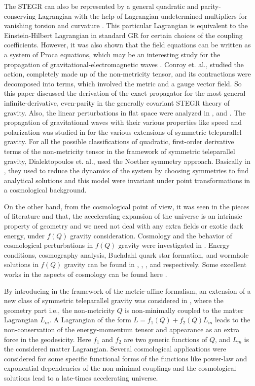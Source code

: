 \documentclass[showpacs,aps,amssymb,preprintnumbers,prd,amsmath,floatfix]{revtex4}
\begin{document}
The STEGR can also be represented by a general quadratic and parity-conserving Lagrangian with the help of Lagrangian undetermined multipliers for vanishing torsion and curvature \cite{Adak}. This particular Lagrangian is equivalent to the Einstein-Hilbert Lagrangian in standard GR for certain choices of the coupling coefficients. However, it was also shown that the field equations can be written as a system of Proca equations, which may be an interesting study for the propagation of gravitational-electromagnetic waves \cite{Mol}. Conroy et. al., \cite{Conroy} studied the action, completely made up of the non-metricity tensor, and its contractions were decomposed into terms, which involved the metric and a gauge vector field. So this paper discussed the derivation of the exact propagator for the most general infinite-derivative, even-parity in the generally covariant STEGR theory of gravity. Also, the linear perturbations in flat space were analyzed in \cite{Conroy,Kovisto}, and \cite{Beltran}. The propagation of gravitational waves with their various properties like speed and polarization was studied in \cite{Soudi} for the various extensions of symmetric teleparallel gravity. For all the possible classifications of quadratic, first-order derivative terms of the non-metricity tensor in the framework of symmetric teleparallel gravity, Dialektopoulos et. al.,\cite{Dia} used the Noether symmetry approach. Basically in \cite{Dia}, they used to reduce the dynamics of the system by choosing symmetries to find analytical solutions and this model were invariant under point transformations in a cosmological background. 

On the other hand, from the cosmological point of view, it was seen in the pieces of literature \cite{Lu} and \cite{Laz} that, the accelerating expansion of the universe is an intrinsic property of geometry and we need not deal with any extra fields or exotic dark energy, under $f(Q)$ gravity consideration. Cosmology and the behavior of cosmological perturbations in $f(Q)$ gravity were investigated in \cite{Lavi2}. Energy conditions, cosmography analysis, Buchdahl quark star formation, and wormhole solutions in $f(Q)$ gravity can be found in \cite{Sanjay1}, \cite{Sanjay2}, \cite{Sneha}, and \cite{Mustafa1,Hassan1} respectively. Some excellent works in the aspects of cosmology can be found here \cite{Raja,De,Raja2,Sanjay3,Sanjay4}.

By introducing in the framework of the metric-affine formalism, an extension of a new class of symmetric teleparallel gravity was considered in \cite{Harko}, where the geometry part i.e., the non-metricity $Q$ is non-minimally coupled to the matter Lagrangian $L_{m}$. A Lagrangian of the form $L=f_1(Q)+f_2(Q)L_{m}$ leads to the non-conservation of the energy-momentum tensor and appearance as an extra force in the geodesicity. Here $f_1$ and $f_2$ are two generic functions of $Q$, and $L_{m}$ is the considered matter Lagrangian. Several cosmological applications were considered for some specific functional forms of the functions like power-law and exponential dependencies of the non-minimal couplings and the cosmological solutions lead to a late-times accelerating universe.
\end{document}
